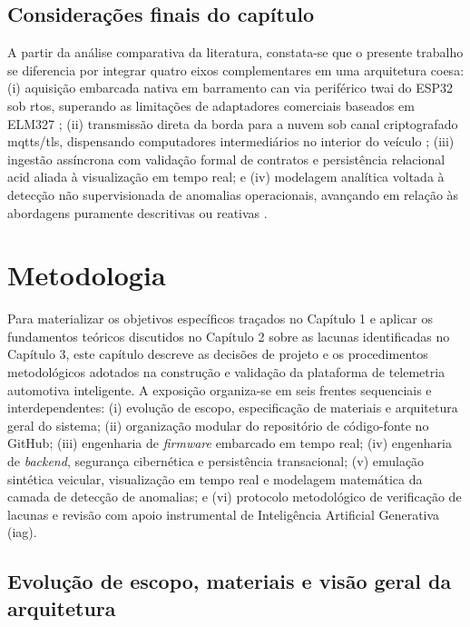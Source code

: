 \documentclass[
	12pt,				%
	openright,			%
	twoside,			%
	a4paper,			%
	english,			%
	brazil				%
	]{abntex2}
\begin{document}
\section{Considerações finais do capítulo}

A partir da análise comparativa da literatura, constata-se que o presente trabalho se
diferencia por integrar quatro eixos complementares em uma arquitetura coesa: (i)
aquisição embarcada nativa em barramento \acrshort{can} via periférico \acrshort{twai}
do ESP32 sob \acrshort{rtos}, superando as limitações de adaptadores comerciais baseados
em ELM327 \cite{andria2016,marques2019}; (ii) transmissão direta da borda para a nuvem
sob canal criptografado \acrshort{mqtts}/\acrshort{tls}, dispensando computadores
intermediários no interior do veículo \cite{junior2009,oliveira2022}; (iii) ingestão
assíncrona com validação formal de contratos e persistência relacional \acrshort{acid}
aliada à visualização em tempo real; e (iv) modelagem analítica voltada à detecção não
supervisionada de anomalias operacionais, avançando em relação às abordagens puramente
descritivas ou reativas \cite{singh2021,yu2024}.

\chapter{Metodologia}

Para materializar os objetivos específicos traçados no Capítulo 1 e aplicar os
fundamentos teóricos discutidos no Capítulo 2 sobre as lacunas identificadas no Capítulo
3, este capítulo descreve as decisões de projeto e os procedimentos metodológicos
adotados na construção e validação da plataforma de telemetria automotiva inteligente. A
exposição organiza-se em seis frentes sequenciais e interdependentes: (i) evolução de
escopo, especificação de materiais e arquitetura geral do sistema; (ii) organização
modular do repositório de código-fonte no GitHub; (iii) engenharia de \textit{firmware}
embarcado em tempo real; (iv) engenharia de \textit{backend}, segurança cibernética e
persistência transacional; (v) emulação sintética veicular, visualização em tempo real e
modelagem matemática da camada de detecção de anomalias; e (vi) protocolo metodológico
de verificação de lacunas e revisão com apoio instrumental de Inteligência Artificial
Generativa (\acrshort{iag}).

\section{Evolução de escopo, materiais e visão geral da arquitetura}
\end{document}
